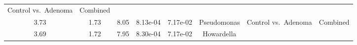 \documentclass[12pt,]{article}
\begin{document}
\begin{longtable}[]{@{}cccccccc@{}}
\begin{minipage}[t]{0.14\columnwidth}
Control vs.~Adenoma\strut
\end{minipage} & \begin{minipage}[t]{0.09\columnwidth}\centering\strut
Combined\strut
\end{minipage}\tabularnewline
\begin{minipage}[t]{0.05\columnwidth}\centering\strut
3.73\strut
\end{minipage} & \begin{minipage}[t]{0.09\columnwidth}\centering\strut
1.73\strut
\end{minipage} & \begin{minipage}[t]{0.09\columnwidth}\centering\strut
8.05\strut
\end{minipage} & \begin{minipage}[t]{0.07\columnwidth}\centering\strut
8.13e-04\strut
\end{minipage} & \begin{minipage}[t]{0.07\columnwidth}\centering\strut
7.17e-02\strut
\end{minipage} & \begin{minipage}[t]{0.20\columnwidth}\centering\strut
Pseudomonas\strut
\end{minipage} & \begin{minipage}[t]{0.14\columnwidth}\centering\strut
Control vs.~Adenoma\strut
\end{minipage} & \begin{minipage}[t]{0.09\columnwidth}\centering\strut
Combined\strut
\end{minipage}\tabularnewline
\begin{minipage}[t]{0.05\columnwidth}\centering\strut
3.69\strut
\end{minipage} & \begin{minipage}[t]{0.09\columnwidth}\centering\strut
1.72\strut
\end{minipage} & \begin{minipage}[t]{0.09\columnwidth}\centering\strut
7.95\strut
\end{minipage} & \begin{minipage}[t]{0.07\columnwidth}\centering\strut
8.30e-04\strut
\end{minipage} & \begin{minipage}[t]{0.07\columnwidth}\centering\strut
7.17e-02\strut
\end{minipage} & \begin{minipage}[t]{0.20\columnwidth}\centering\strut
Howardella\strut
\end{minipage} & \begin{minipage}[t]{0.14\columnwidth}\centering\strut

\end{minipage}
\end{longtable}
\end{document}
